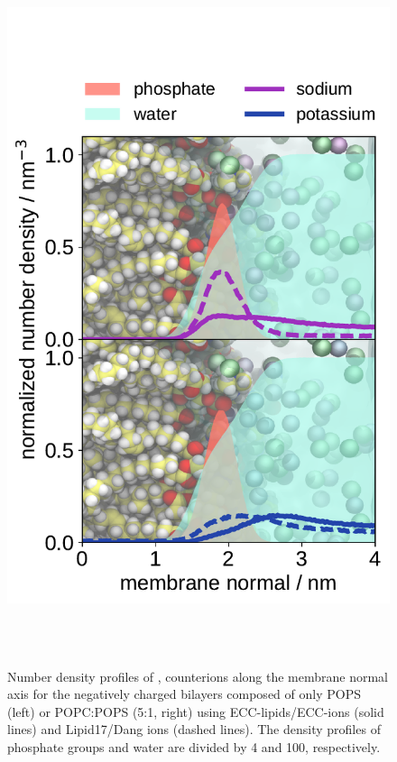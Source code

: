 \documentclass[journal=jpcbfk,manuscript=article]{achemso}
\newlength{\figheight}
\begin{document}
\begin{figure}[tbp!]
  \includegraphics[height=\figheight]{../img/ecc_pops/density_profiles_na-k-counterions_wat_phos_compar_5PC-1PS_ecclipids-lipid17.pdf}
  \caption{\label{fig:POPS-counterions-dens}
    Number density profiles of ,  counterions along the membrane normal axis 
    for the negatively charged bilayers composed of only POPS (left) or POPC:POPS (5:1, right) 
    using ECC-lipids/ECC-ions (solid lines) and Lipid17/Dang ions (dashed lines).  
    The density profiles of phosphate groups and water are divided by 4 and 100, respectively.  
}
 \\
 \\
\end{figure} 
\end{document}
